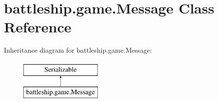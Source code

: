 \hypertarget{classbattleship_1_1game_1_1Message}{}\section{battleship.\+game.\+Message Class Reference}
\label{classbattleship_1_1game_1_1Message}
Inheritance diagram for battleship.\+game.\+Message\+:\begin{figure}[H]
\begin{center}
\leavevmode
\includegraphics[height=2.000000cm]{classbattleship_1_1game_1_1Message}
\end{center}
\end{figure}
